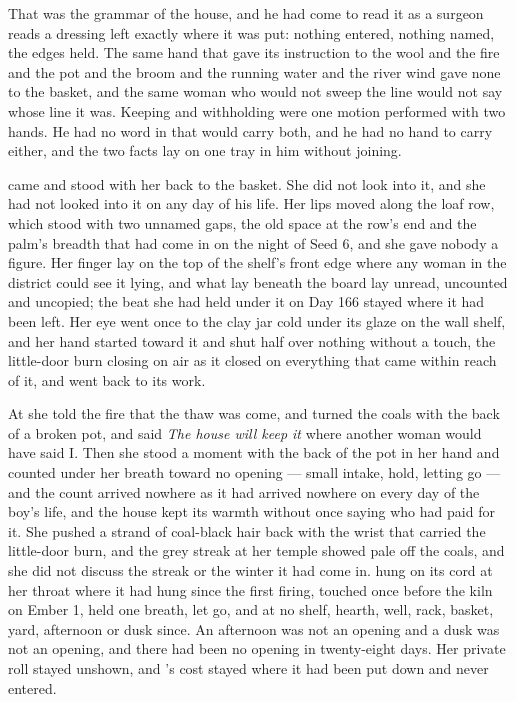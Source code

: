 That was the grammar of the house, and he had come to read it as a surgeon reads a dressing left exactly where it was put: nothing entered, nothing named, the edges held. The same hand that gave its instruction to the wool and the fire and the pot and the broom and the running water and the river wind gave none to the basket, and the same woman who would not sweep the line would not say whose line it was. Keeping and withholding were one motion performed with two hands. He had no word in  that would carry both, and he had no hand to carry either, and the two facts lay on one tray in him without joining.

 came and stood with her back to the basket. She did not look into it, and she had not looked into it on any day of his life. Her lips moved along the loaf row, which stood with two unnamed gaps, the old space at the row's end and the palm's breadth that had come in on the night of Seed 6, and she gave nobody a figure. Her finger lay on the top of the shelf's front edge where any woman in the district could see it lying, and what lay beneath the board lay unread, uncounted and uncopied; the beat she had held under it on Day 166 stayed where it had been left. Her eye went once to the clay jar cold under its glaze on the wall shelf, and her hand started toward it and shut half over nothing without a touch, the little-door burn closing on air as it closed on everything that came within reach of it, and went back to its work.

At  she told the fire that the thaw was come, and turned the coals with the back of a broken pot, and said \emph{The house will keep it} where another woman would have said I. Then she stood a moment with the back of the pot in her hand and counted under her breath toward no opening --- small intake, hold, letting go --- and the count arrived nowhere as it had arrived nowhere on every day of the boy's life, and the house kept its warmth without once saying who had paid for it. She pushed a strand of coal-black hair back with the wrist that carried the little-door burn, and the grey streak at her temple showed pale off the coals, and she did not discuss the streak or the winter it had come in.  hung on its cord at her throat where it had hung since the first firing, touched once before the kiln on Ember 1, held one breath, let go, and at no shelf, hearth, well, rack, basket, yard, afternoon or dusk since. An afternoon was not an opening and a dusk was not an opening, and there had been no opening in twenty-eight days. Her private roll stayed unshown, and 's cost stayed where it had been put down and never entered.

